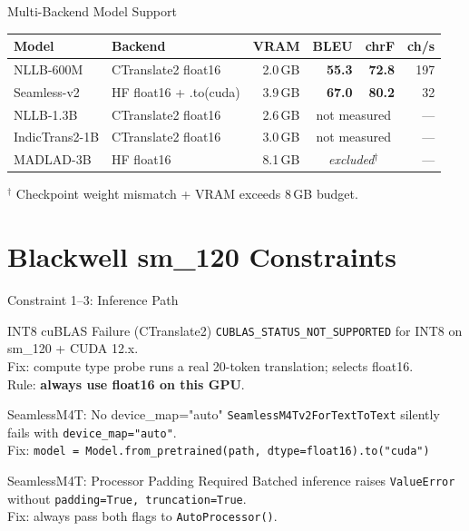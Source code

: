 \documentclass[aspectratio=169,10pt]{beamer}
\begin{document}
\begin{frame}{Multi-Backend Model Support}
  \begin{table}
  \small
  \centering
  \begin{tabular}{llrrrr}
    \toprule
    Model & Backend & VRAM & BLEU & chrF & ch/s \\
    \midrule
    NLLB-600M & CTranslate2 float16 & 2.0\,GB & \textbf{55.3} & \textbf{72.8} & 197 \\
    Seamless-v2 & HF float16 + .to(cuda) & 3.9\,GB & \textbf{67.0} & \textbf{80.2} & 32 \\
    NLLB-1.3B & CTranslate2 float16 & 2.6\,GB & \multicolumn{2}{c}{not measured} & --- \\
    IndicTrans2-1B & CTranslate2 float16 & 3.0\,GB & \multicolumn{2}{c}{not measured} & --- \\
    MADLAD-3B & HF float16 & 8.1\,GB & \multicolumn{2}{c}{\textit{excluded}$^\dagger$} & --- \\
    \bottomrule
  \end{tabular}
  \end{table}
  \footnotesize $^\dagger$ Checkpoint weight mismatch + VRAM exceeds 8\,GB budget.
\end{frame}

\section{Blackwell sm\_120 Constraints}

\begin{frame}{Constraint 1--3: Inference Path}
  \begin{block}{INT8 cuBLAS Failure (CTranslate2)}
    \texttt{CUBLAS\_STATUS\_NOT\_SUPPORTED} for INT8 on sm\_120 + CUDA 12.x.\\
    Fix: compute type probe runs a real 20-token translation; selects float16.\\
    Rule: \textbf{always use float16 on this GPU}.
  \end{block}
  \vspace{0.2cm}
  \begin{block}{SeamlessM4T: No device\_map="auto"}
    \texttt{SeamlessM4Tv2ForTextToText} silently fails with \texttt{device\_map="auto"}.\\
    Fix: \texttt{model = Model.from\_pretrained(path, dtype=float16).to("cuda")}
  \end{block}
  \vspace{0.2cm}
  \begin{block}{SeamlessM4T: Processor Padding Required}
    Batched inference raises \texttt{ValueError} without \texttt{padding=True, truncation=True}.\\
    Fix: always pass both flags to \texttt{AutoProcessor()}.
  \end{block}
\end{frame}
\end{document}
